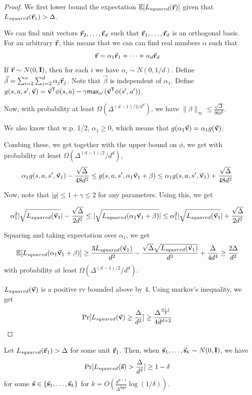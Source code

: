 \begin{proof}
We first lower bound the expectation $\mathbb{E}[L_{squared}(\vec{{\mathbf{r}}})]$ given that $L_{squared}(\vec{{\mathbf{r}}}_1)>\Delta$. 
    
We can find unit vectors $\vec{{\mathbf{r}}}_2, \dots, \vec{{\mathbf{r}}}_d$ such that $\vec{{\mathbf{r}}}_1, \dots, \vec{{\mathbf{r}}}_d$ is an orthogonal basis.
For an arbitrary $\vec{{\mathbf{r}}}$, this means that we can can find real numbers $\alpha$ such that
\[
    \vec{{\mathbf{r}}} = \alpha_1 \vec{{\mathbf{r}}}_1 + \dots + \alpha_d \vec{{\mathbf{r}}}_d
\]
If $\vec{{\mathbf{r}}} \sim N(0,\mathbf{I})$, then for each $i$ we have $\alpha_i \sim N(0, 1/d)$. Define $\vec{\beta} = \sum_{i=2}^n \sum_{j=2}^d \alpha_{j}\vec{{\mathbf{r}}}_j$. Note that $\vec{\beta}$ is independent of $\alpha_1$. 
Define $g(s,a,s',\vec{{\mathbf{v}}}) = \vec{{\mathbf{v}}}^{\sf T}\phi(s,a) - \gamma \mathsf{max}_{a'}(\vec{{\mathbf{v}}}^{\sf T} \phi(s',a'))$.

Now, with probability at least $\Omega(\Delta^{(d-1)/2 / d^d})$, we have $\| \beta \|_{\infty} \leq \frac{\sqrt{\Delta}}{96d^2}$. 

We also know that w.p. 1/2, $\alpha_1 \geq 0$, which means that $g(\alpha_1 \vec{{\mathbf{v}}}) = \alpha_1 g(\vec{{\mathbf{v}}})$.

Combing these, we get together with the upper bound on $\phi$, we get with probability at least $\Omega(\Delta^{(d-1)/2} / d^d)$,
\[
\alpha_1 g(s,a,s',\vec{{\mathbf{v}}}_1) - \frac{\sqrt{\Delta}}{48d^2} \leq g(s,a,s',\alpha_1 \vec{{\mathbf{v}}}_1 + \beta )\leq \alpha_1 g(s,a,s',\vec{{\mathbf{v}}}_1) + \frac{\sqrt{\Delta}}{48d^2}
\]

Now, note that $|g| \leq 1+\gamma \leq 2$ for any parameters. Using this, we get 

\[
\alpha_1^2|\sqrt{L_{squared}(\vec{{\mathbf{v}}}_1}|-\frac{\sqrt{\Delta}}{2d^2} \leq |\sqrt{L_{squared}(\alpha_1\vec{{\mathbf{v}}}_1+ \beta)}|\leq \alpha_1^2|\sqrt{L_{squared}(\vec{{\mathbf{v}}}_1}|+\frac{\sqrt{\Delta}}{2d^2} 
\]

Squaring and taking expectation over $\alpha_1$, we get
\[
\mathbb{E}[L_{squared}(\alpha_1 \vec{{\mathbf{v}}}_1 + \beta)] \geq \frac{3L_{squared}(\vec{{\mathbf{v}}}_1)}{d^2} - \frac{\sqrt{\Delta}\sqrt{L_{squared}(\vec{{\mathbf{v}}}_1)}}{d^3} + \frac{\Delta}{4d^4} \geq \frac{2\Delta}{d^2}
\]
with probability at least $\Omega(\Delta^{(d-1)/2} / d^d)$.


$L_{squared}(\vec{{\mathbf{v}}})$ is a positive rv bounded above by 4. Using markov's inequality, we get
\[
\Pr[L_{squared}(\vec{{\mathbf{v}}}) \geq \frac{\Delta}{d^2}] \geq  \frac{\Delta^{\frac{d+1}{2}}}{4d^{d+2}}
\]
\end{proof}

\begin{lemma}
    Let $L_{squared}(\vec{{\mathbf{r}}}_1) > \Delta$ for some unit $\vec{{\mathbf{r}}}_1$. Then, when $\vec{{\mathbf{s}}}_1,\dots, \vec{{\mathbf{s}}}_k \sim N(0, \mathbf{I})$, we have
    \[
        \Pr[L_{squared}(\vec{{\mathbf{s}}}) > \frac{\Delta}{d^2}] \geq 1 - \delta
    \]
    for some $\vec{{\mathbf{s}}} \in \{\vec{{\mathbf{s}}}_1, \dots, \vec{{\mathbf{s}}}_k\}$ for $k = O(\frac{d^{d+2}}{\Delta^{\frac{d+1}{2}}}\log(1/\delta))$.
\end{lemma}

